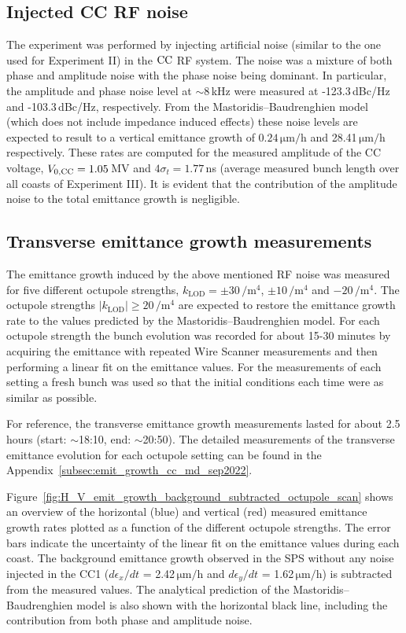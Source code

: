 \subsection{Injected CC RF noise}\label{subsec:cc_rf_noise_exp3}
The experiment was performed by injecting artificial noise (similar to the one used for Experiment II) in the ${\mathrm{CC}}$ RF system. The noise was a mixture of both phase and amplitude noise with the phase noise being dominant. In particular, the amplitude and phase noise level at $\sim$8\,kHz were measured at -123.3\,dBc/Hz and -103.3\,dBc/Hz, respectively. From the Mastoridis--Baudrenghien model (which does not include impedance induced effects) these noise levels are expected to result to a vertical emittance growth of $0.24$\,$\mathrm{\mu m/h}$ and 28.41\,$\mathrm{\mu m/h}$ respectively. These rates are computed for the measured amplitude of the CC voltage, ${V_\mathrm{0, CC}}=1.05$\,MV and $4\sigma_t=1.77$\,ns (average measured bunch length over all coasts of Experiment III). It is evident that the contribution of the amplitude noise to the total emittance growth is negligible. %


\subsection{Transverse emittance growth measurements}\label{subsec:cc_rf_noise_emit_growth_exp3}
The emittance growth induced by the above mentioned RF noise was measured for five different octupole strengths, $k_\mathrm{LOD}=\pm 30$\,$\mathrm{/m^4}$, $ \pm 10$\,$\mathrm{/m^4}$ and $-20$\,$\mathrm{/m^4}$. The octupole strengths $| k_\mathrm{LOD} | \geq 20$\,$\mathrm{/m^4}$ are expected to restore the emittance growth rate to the values predicted by the Mastoridis--Baudrenghien model. For each octupole strength the bunch evolution was recorded for about 15-30 minutes by acquiring the emittance with repeated Wire Scanner measurements and then performing a linear fit on the emittance values. For the measurements of each setting a fresh bunch was used so that the initial conditions each time were as similar as possible.

For reference, the transverse emittance growth measurements lasted for about 2.5\,hours (start: $\sim$18:10, end: $\sim$20:50). The detailed measurements of the transverse emittance evolution for each octupole setting can be found in the Appendix~\ref{subsec:emit_growth_cc_md_sep2022}. 

Figure~\ref{fig:H_V_emit_growth_background_subtracted_octupole_scan} shows an overview of the horizontal (blue) and vertical (red) measured emittance growth rates plotted as a function of the different octupole strengths. The error bars indicate the uncertainty of the linear fit on the emittance values during each coast. The background emittance growth observed in the SPS without any noise injected in the CC1 ($d\epsilon_x/dt$ = 2.42\,$\mathrm{\mu m/h}$ and $d\epsilon_y/dt$ = 1.62\,$\mathrm{\mu m/h}$) is subtracted from the measured values. The analytical prediction of the Mastoridis--Baudrenghien model is also shown with the horizontal black line, including the contribution from both phase and amplitude noise.

